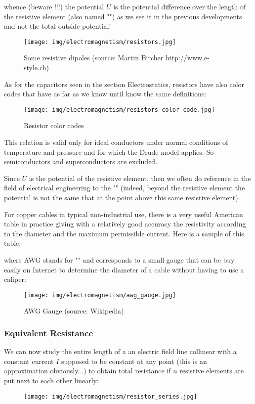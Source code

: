 	whence (beware !!!) the potential $U$ is the potential difference over the length of the resistive element (also named "") as we see it in the previous developments and not the total outside potential!
	\begin{figure}[H]
		\centering
		\texttt{[image: img/electromagnetism/resistors.jpg]}
		\caption{Some resistive dipoles (source: Martin Bircher http://www.e-style.ch)}
	\end{figure}
	As for the capacitors seen in the section Electrostatics, resistors have also color codes that have as far as we know until know the same definitions:
	\begin{figure}[H]
		\centering
		\texttt{[image: img/electromagnetism/resistors\_color\_code.jpg]}
		\caption{Resistor color codes}
	\end{figure}
	\begin{tcolorbox}[title=Remark,colframe=black,arc=10pt]
	This relation is valid only for ideal conductors under normal conditions of temperature and pressure and for which the Drude model applies. So semiconductors and superconductors are excluded.
	\end{tcolorbox}
	Since $U$ is the potential of the resistive element, then we often do reference in the field of electrical engineering to the "" (indeed, beyond the resistive element the potential is not the same that at the point above this same resistive element).
	
	For copper cables in typical non-industrial use, there is a very useful American table in practice giving with a relatively good accuracy the resistivity according to the diameter and the maximum permissible current. Here is a sample of this table:
	
	where AWG stands for "" and corresponds to a small gauge that can be buy easily on Internet to determine the diameter of a cable without having to use a caliper:
	\begin{figure}[H]
		\centering
		\texttt{[image: img/electromagnetism/awg\_gauge.jpg]}
		\caption{AWG Gauge  (source: Wikipedia)}
	\end{figure}
	
	\pagebreak
	\subsubsection{Equivalent Resistance}
	We can now study the entire length of a an electric field line collinear with a constant current $I$ supposed to be constant at any point (this is an approximation obviously...) to obtain total resistance if $n$ resistive elements are put  next to each other linearly:
	\begin{figure}[H]
		\centering
		\texttt{[image: img/electromagnetism/resistor\_series.jpg]}
	\end{figure}
	
